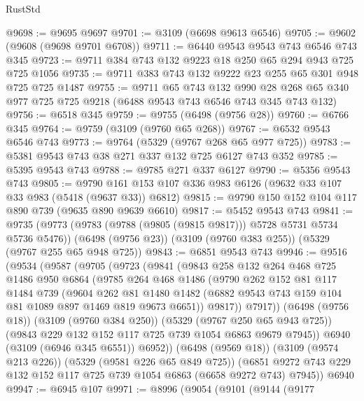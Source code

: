 \begin{lexlean}{RustStd}
\begin{coremodule}
@9698 := @9695 @9697
@9701 := @3109 (@6698 @9613 @6546)
@9705 := @9602 (@9608 (@9698 @9701 @6708))
@9711 := @6440 @9543 @9543 @743 @6546 @743 @345
@9723 := @9711 @384 @743 @132 @9223 @18 @250 @65 @294 @943 @725 @725 @1056
@9735 := @9711 @383 @743 @132 @9222 @23 @255 @65 @301 @948 @725 @725 @1487
@9755 := @9711
    @65
    @743
    @132
    @990
    @28
    @268
    @65
    @340
    @977
    @725
    @725
    @9218
    (@6488 @9543 @743 @6546 @743 @345 @743 @132)
@9756 := @6518 @345
@9759 := @9755 (@6498 (@9756 @28))
@9760 := @6766 @345
@9764 := @9759 (@3109 (@9760 @65 @268))
@9767 := @6532 @9543 @6546 @743
@9773 := @9764 (@5329 (@9767 @268 @65 @977 @725))
@9783 := @5381 @9543 @743 @38 @271 @337 @132 @725 @6127 @743 @352
@9785 := @5395 @9543 @743
@9788 := @9785 @271 @337 @6127
@9790 := @5356 @9543 @743
@9805 := @9790 @161 @153 @107 @336 @983 @6126 (@9632 @33 @107 @33 @983 (@5418 (@9637 @33)) @6812)
@9815 := @9790 @150 @152 @104 @117 @890 @739 (@9635 @890 @9639 @6610)
@9817 := @5452 @9543 @743
@9841 := @9735
    (@9773 (@9783 (@9788 (@9805 (@9815 @9817))) @5728 @5731 @5734 @5736 @5476))
    (@6498 (@9756 @23))
    (@3109 (@9760 @383 @255))
    (@5329 (@9767 @255 @65 @948 @725))
@9843 := @6851 @9543 @743
@9946 := @9516
    (@9534
      (@9587
        (@9705
          (@9723
            (@9841
              (@9843
                @258
                @132
                @264
                @468
                @725
                @1486
                @950
                @6864
                (@9785
                  @264
                  @468
                  @1486
                  (@9790
                    @262
                    @152
                    @81
                    @117
                    @1484
                    @739
                    (@9604
                      @262
                      @81
                      @1480
                      @1482
                      (@6882 @9543 @743 @159 @104 @81 @1089 @897 @1469 @819 @9673 @6651))
                    @9817))
                @7917))
            (@6498 (@9756 @18))
            (@3109 (@9760 @384 @250))
            (@5329 (@9767 @250 @65 @943 @725))
            (@9843 @229 @132 @152 @117 @725 @739 @1054 @6863 @9679 @7945))
          @6940
          (@3109 (@6946 @345 @6551))
          @6952))
      (@6498 (@9569 @18))
      (@3109 (@9574 @213 @226))
      (@5329 (@9581 @226 @65 @849 @725))
      (@6851 @9272 @743 @229 @132 @152 @117 @725 @739 @1054 @6863 (@6658 @9272 @743) @7945))
    @6940
@9947 := @6945 @107
@9971 := @8996
    (@9054
      (@9101
        (@9144
          (@9177

\end{coremodule}
\end{lexlean}
